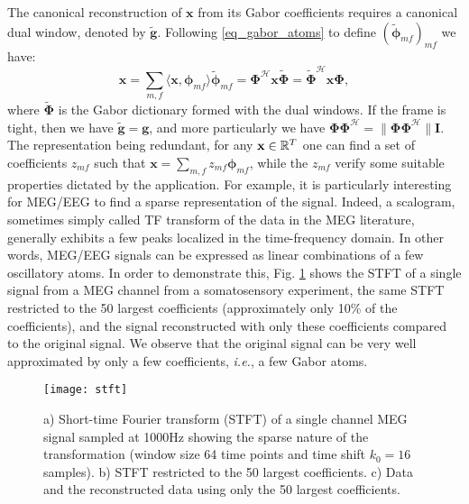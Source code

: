 The canonical reconstruction of $\mathbf{x}$ from its Gabor coefficients requires a canonical dual window, denoted by $\mathbf{\tilde{g}}$. Following \ref{eq_gabor_atoms} to define $(\tilde{\mathbf{\phi}}_{mf})_{mf}$ we have:
\begin{equation} \label{eq_TF_recons}
	\mathbf{x}=\sum_{m,f}\langle\mathbf{x}, \mathbf{\phi}_{mf}\rangle\tilde{\mathbf{\phi}}_{mf}=\mathbf{\Phi}^{\mathcal{H}}\mathbf{x\tilde{\Phi}}=\tilde{\mathbf{\Phi}}^{\mathcal{H}}\mathbf{x\Phi},
\end{equation}
where $\tilde{\mathbf{\Phi}}$ is the Gabor dictionary formed with the dual windows. If the frame is tight, then we have $\tilde{\mathbf{g}}=\mathbf{g}$, and more particularly we have $\mathbf{\Phi\Phi}^{\mathcal{H}}=\|\mathbf{\Phi\Phi}^{\mathcal{H}}\|\mathbf{I}$. The representation being redundant, for any $\mathbf{x}\in\mathbb{R}^T$ one can find a set of coefficients $z_{mf}$ such that $\mathbf{x}=\sum_{m,f}z_{mf}\mathbf{\phi}_{mf}$, while the $z_{mf}$ verify some suitable properties dictated by the application. For example, it is particularly interesting for MEG/EEG to find a sparse representation of the signal. Indeed, a scalogram, sometimes simply called TF transform of the data in the MEG literature, generally exhibits a few peaks localized in the time-frequency domain. In other words, MEG/EEG signals can be expressed as linear combinations of a few oscillatory atoms. In order to demonstrate this, Fig. \ref{fig:stft} shows the STFT of a single signal from a MEG channel from a somatosensory experiment, the same STFT restricted to the 50 largest coefficients (approximately only 10\% of the coefficients), and the signal reconstructed with only these coefficients compared to the original signal. We observe that the original signal can be very well approximated by only a few coefficients, \textit{i.e.}, a few Gabor atoms.

\begin{figure}
\centering
	\texttt{[image: stft]}
    \caption{a) Short-time Fourier transform (STFT) of a single channel MEG signal sampled at 1000Hz showing the sparse nature of the transformation (window size 64 time points and time shift $k_0=16$ samples). b) STFT restricted to the 50 largest coefficients. c) Data and the reconstructed data using only the 50 largest coefficients.}
	\label{fig:stft}
\end{figure}

